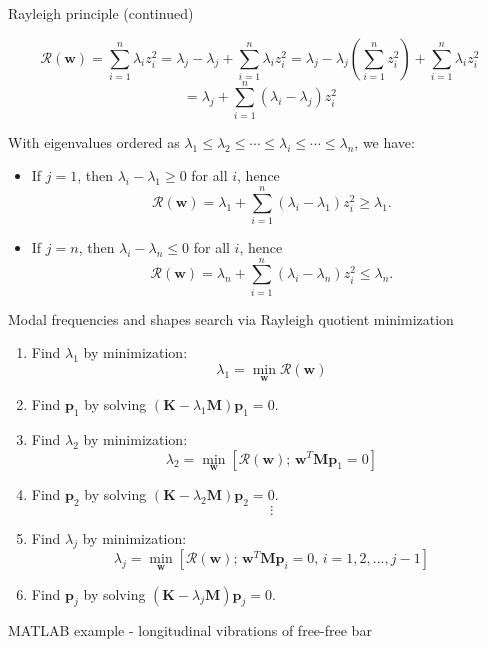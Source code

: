\documentclass[aspectratio=169]{beamer}
\begin{document}
\begin{frame}{Rayleigh principle (continued)}

  \[
    \mathcal{R}(\mathbf{w}) = \sum_{i=1}^n \lambda_i z_i^2 = \lambda_j - \lambda_j + \sum_{i=1}^n \lambda_i z_i^2 = \lambda_j - \lambda_j \left( \sum_{i=1}^n z_i^2 \right) + \sum_{i=1}^n \lambda_i z_i^2
  \]
  \[
    = \lambda_j + \sum_{i=1}^n (\lambda_i - \lambda_j) z_i^2
  \]

  \bigskip

  With eigenvalues ordered as \( \lambda_1 \leq \lambda_2 \leq \cdots \leq \lambda_i \leq \cdots \leq \lambda_n \), we have:
  \begin{itemize}
    \item If \( j = 1 \), then \( \lambda_i - \lambda_1 \geq 0 \) for all \( i \), hence
          \[
            \mathcal{R}(\mathbf{w}) = \lambda_1 + \sum_{i=1}^n (\lambda_i - \lambda_1) z_i^2 \geq \lambda_1.
          \]
    \item If \( j = n \), then \( \lambda_i - \lambda_n \leq 0 \) for all \( i \), hence
          \[
            \mathcal{R}(\mathbf{w}) = \lambda_n + \sum_{i=1}^n (\lambda_i - \lambda_n) z_i^2 \leq \lambda_n.
          \]
  \end{itemize}
\end{frame}



\begin{frame}{Modal frequencies and shapes search via Rayleigh quotient minimization}
  \begin{enumerate}
    \item[(1)] Find $\lambda_1$ by minimization: $$\lambda_1 = \min_{\mathbf{w}}
            \mathcal{R}(\mathbf{w})$$
    \item[(2)] Find $\mathbf p_1$ by solving $(\mathbf{K} - \lambda_1 \mathbf{M}) \mathbf{p}_1  = 0$.
          \vspace{0.3cm}
    \item[(3)] Find $\lambda_2$ by minimization: $$\lambda_2 = \min_{\mathbf{w}} [\mathcal{R}(\mathbf{w}); \, \mathbf{w}^T \mathbf{M} \mathbf{p}_1 = 0]$$
    \item[(4)] Find $\mathbf p_2$ by solving $(\mathbf{K} - \lambda_2 \mathbf{M}) \mathbf{p}_2  = 0$.
          \[
            \vdots
          \]
    \item[(j)]  Find $\lambda_j$ by minimization: $$\lambda_j = \min_{\mathbf{w}} [\mathcal{R}(\mathbf{w}); \, \mathbf{w}^T \mathbf{M} \mathbf{p}_i = 0, \, i = 1, 2, \dots, j-1]$$
    \item[(j+1)] Find $\mathbf p_j$ by solving $(\mathbf{K} - \lambda_j \mathbf{M}) \mathbf{p}_j  = 0$.
  \end{enumerate}
\end{frame}

\begin{frame}{MATLAB example - longitudinal vibrations of free-free bar}
  \begin{center}
    \href{https://drive.mathworks.com/sharing/6a9792ef-d0a7-4aca-a1d0-8b1862b0ac3b}{}
  \end{center}
\end{frame}
\end{document}
